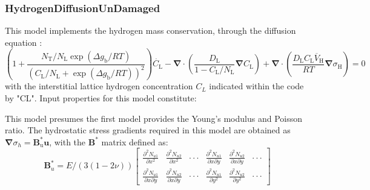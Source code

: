 \documentclass[3p]{elsarticle} %
\begin{document}
\subsubsection{HydrogenDiffusionUnDamaged}
This model implements the hydrogen mass conservation, through the diffusion equation \citep{Oriani1974, Martinez-Paneda2020, Kristensen2020a, Golahmar2021, Hageman2022}:
\begin{equation}
    \left( 1+\frac{N_\mathrm{T}/N_\mathrm{L} \exp\left(\Delta g_\mathrm{b}/RT\right)}{\left(C_\mathrm{L}/N_\mathrm{L}+\exp\left(\Delta g_\mathrm{b}/RT\right)\right)^2}\right) \dot{C_\mathrm{L}}-\bm{\nabla}\cdot\left(\frac{D_\mathrm{L}}{1-C_\mathrm{L}/N_\mathrm{L}}\bm{\nabla} C_\mathrm{L}\right) + \bm{\nabla} \cdot \left( \frac{D_\mathrm{L} C_\mathrm{L} \overline{V}_\mathrm{H}}{RT}\bm{\nabla}\sigma_\mathrm{H} \right) = 0
\end{equation}
with the interstitial lattice hydrogen concentration $C_L$ indicated within the code by "CL". Input properties for this model constitute:

This model presumes the first model provides the Young's modulus and Poisson ratio. The hydrostatic stress gradients required in this model are obtained as $\bm{\nabla}\sigma_h=\bm{B}_\mathrm{u}^*\mathbf{u}$, with the $\bm{B}^*$ matrix defined as:
\begin{equation}
    \bm{B}_u^* = E/(3(1-2\nu))
    \begin{bmatrix} \frac{\partial^2 N_{u1}}{\partial x^2} & \frac{\partial^2 N_{u2}}{\partial x^2} & \cdot\cdot\cdot & \frac{\partial^2 N_{u1}}{\partial x\partial y} & \frac{\partial^2 N_{u2}}{\partial x\partial y} & \cdot \cdot \cdot \\
    \frac{\partial^2 N_{u1}}{\partial x\partial y} & \frac{\partial^2 N_{u2}}{\partial x \partial y} & \cdot\cdot\cdot & \frac{\partial^2 N_{u1}}{\partial y^2} & \frac{\partial^2 N_{u2}}{\partial y^2} & \cdot \cdot \cdot
    \end{bmatrix}
\end{equation}
\end{document}
